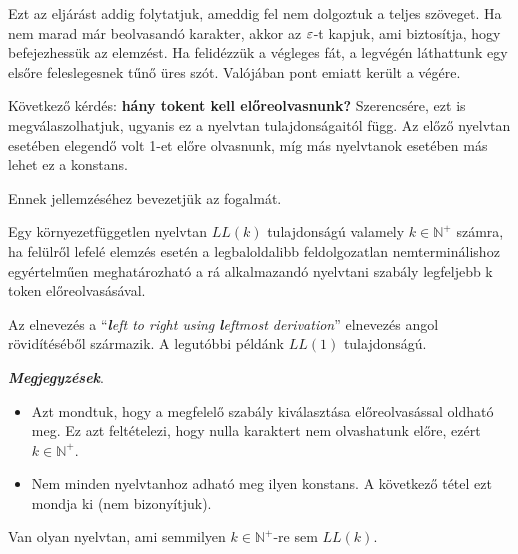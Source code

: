 Ezt az eljárást addig folytatjuk, ameddig fel nem dolgoztuk a teljes szöveget. Ha nem marad már beolvasandó karakter, akkor az $\varepsilon$-t kapjuk, ami biztosítja, hogy befejezhessük az elemzést. Ha felidézzük a végleges fát, a legvégén láthattunk egy elsőre feleslegesnek tűnő üres szót. Valójában pont emiatt került a végére.


Következő kérdés: \textbf{hány tokent kell előreolvasnunk?}  Szerencsére, ezt is megválaszolhatjuk, ugyanis ez a nyelvtan tulajdonságaitól függ. Az előző nyelvtan esetében elegendő volt 1-et előre olvasnunk, míg más nyelvtanok esetében más lehet ez a konstans.

Ennek jellemzéséhez bevezetjük az  fogalmát.

\begin{tcolorbox}
	\begin{definition}[$LL(k)$ nyelvtan]
		Egy környezetfüggetlen nyelvtan $LL(k)$ tulajdonságú valamely $k \in \mathbb{N}^+$ számra,
		ha felülről lefelé elemzés esetén a legbaloldalibb feldolgozatlan
		nemterminálishoz egyértelműen meghatározható a rá alkalmazandó
		nyelvtani szabály legfeljebb k token előreolvasásával.
	\end{definition}
\end{tcolorbox}

Az elnevezés a ``\textit{\textbf{l}eft to right using \textbf{l}eftmost derivation}'' elnevezés angol rövidítéséből származik. A legutóbbi példánk $LL(1)$ tulajdonságú.

\textbf{\textit{Megjegyzések}}.
\begin{itemize}
	\item Azt mondtuk, hogy a megfelelő szabály kiválasztása előreolvasással oldható meg. Ez azt feltételezi, hogy nulla karaktert nem olvashatunk előre, ezért $k \in \mathbb{N}^+$.
	\item Nem minden nyelvtanhoz adható meg ilyen konstans. A következő tétel ezt mondja ki (nem bizonyítjuk).
\end{itemize}

\begin{tcolorbox}
	\begin{theorem}
		Van olyan nyelvtan, ami semmilyen
		$k \in \mathbb{N}^+$-re sem $LL(k)$.
	\end{theorem}
\end{tcolorbox}

